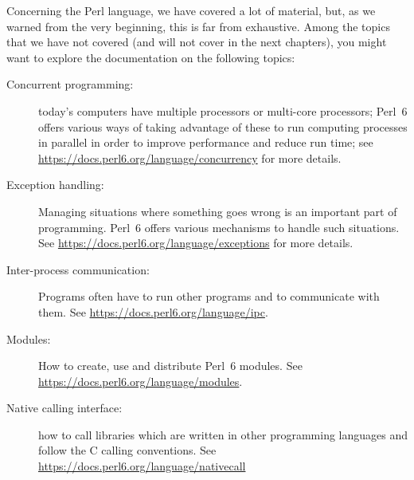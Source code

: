 Concerning the Perl language, we have covered a lot of 
material, but, as we warned from the very beginning, 
this is far from exhaustive. Among the topics that 
we have not covered (and will not cover in the next 
chapters), you might want to explore the documentation 
on the following topics:

\begin{description}
\item[Concurrent programming:] today's computers have 
multiple processors or multi-core processors; Perl~6 
offers various ways of taking advantage of these to 
run computing processes in parallel in order to 
improve performance and reduce run time; see 
\url{https://docs.perl6.org/language/concurrency} 
for more details.

\item[Exception handling:] Managing situations where 
something goes wrong is an important part of 
programming. Perl~6 offers various mechanisms to 
handle such situations. See \url{https://docs.perl6.org/language/exceptions} 
for more details.

\item[Inter-process communication:] Programs often have to 
run other programs and to communicate with them. See 
\url{https://docs.perl6.org/language/ipc}.

\item[Modules:] How to create, use and distribute Perl~6 
modules. See \url{https://docs.perl6.org/language/modules}.

\item[Native calling interface:] how to call libraries 
which are written in other programming languages and 
follow the C calling conventions. 
See \url{https://docs.perl6.org/language/nativecall}

\end{description}